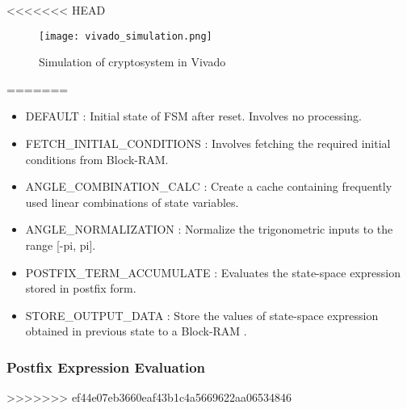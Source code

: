 <<<<<<< HEAD
\begin{figure}[H]
\centering
\texttt{[image: vivado\_simulation.png]}
\caption{Simulation of cryptosystem in Vivado}\label{fig:vivado_simulation}
\end{figure}
=======
\begin{itemize}
\item DEFAULT : Initial state of FSM after reset. Involves no processing.
\item FETCH_INITIAL_CONDITIONS : Involves fetching the required initial conditions from Block-RAM.
\item ANGLE_COMBINATION_CALC : Create a cache containing frequently used linear combinations of state variables.
\item ANGLE_NORMALIZATION : Normalize the trigonometric inputs to the range [-pi, pi].
\item POSTFIX_TERM_ACCUMULATE : Evaluates the state-space expression stored in postfix form.
\item STORE_OUTPUT_DATA : Store the values of state-space expression obtained in previous state to a Block-RAM .
\end{itemize}

\subsubsection{Postfix Expression Evaluation}
>>>>>>> ef44e07eb3660eaf43b1c4a5669622aa06534846

